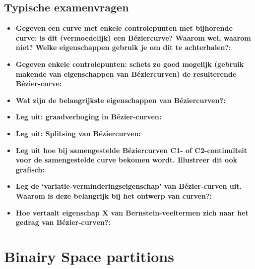 \documentclass[12pt,a4paper]{article}
\begin{document}
	
	\subsection{Typische examenvragen}
	\begin{itemize}
		\item \textbf{Gegeven een curve met enkele controlepunten met bijhorende curve: is dit (vermoedelijk) een Béziercurve? Waarom wel, waarom niet? Welke eigenschappen gebruik je om dit te achterhalen?:}\\
		\item \textbf{Gegeven enkele controlepunten: schets zo goed mogelijk (gebruik makende van eigenschappen van Béziercurven) de resulterende Bézier-curve:}\\
		\item \textbf{Wat zijn de belangrijkste eigenschappen van Béziercurven?:}\\
		\item \textbf{Leg uit: graadverhoging in Bézier-curven:}\\
		\item \textbf{Leg uit: Splitsing van Béziercurven:}\\
		\item \textbf{Leg uit hoe bij samengestelde Béziercurven C1- of C2-continuïteit voor de samengestelde curve bekomen wordt. Illustreer dit ook grafisch:}\\
		\item \textbf{Leg de ‘variatie-verminderingseigenschap’ van Bézier-curven uit. Waarom is deze belangrijk bij het ontwerp van curven?:}\\
		\item \textbf{Hoe vertaalt eigenschap X van Bernstein-veeltermen zich naar het gedrag van Bézier-curven?:}\\
	\end{itemize}
	
	
	\section{Binairy Space partitions}
\end{document}
